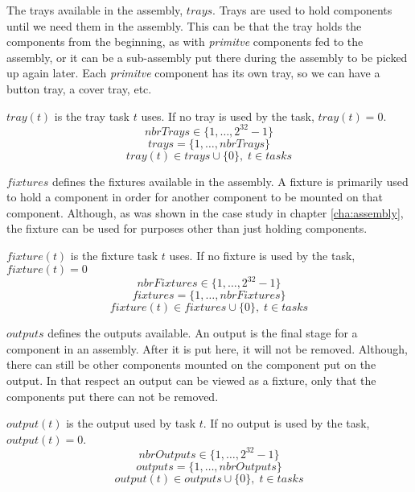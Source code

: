   \noindent The trays available in the assembly, $trays$. Trays are used to hold components until we need them in the assembly. This can be that the tray holds the components from the beginning, as with \emph{primitve} components fed to the assembly, or it can be a sub-assembly put there during the assembly to be picked up again later. Each \emph{primitve} component has its own tray, so we can have a button tray, a cover tray, etc.
  
  $tray(t)$ is the tray task $t$ uses. If no tray is used by the task, $tray(t) = 0$.
 \begin{equation}\label{eq:4}
 nbrTrays \in \{1 , \ldots , 2^{32}-1\}
 \end{equation}
 \begin{equation}\label{eq:14}
 trays = \{1 , \ldots , nbrTrays\}
 \end{equation}
 \begin{equation}\label{eq:22}
 tray(t) \in trays \cup \{0\}, \; t \in tasks
 \end{equation}

  \noindent $fixtures$ defines the fixtures available in the assembly. A fixture is primarily used to hold a component in order for another component to be mounted on that component. Although, as was shown in the case study in chapter \ref{cha:assembly}, the fixture can be used for purposes other than just holding components.
  
  $fixture(t)$ is the fixture task $t$ uses. If no fixture is used by the task, $fixture(t) = 0$
 \begin{equation}\label{eq:5}
 nbrFixtures \in \{1 , \ldots , 2^{32}-1\}
 \end{equation}
 \begin{equation}\label{eq:15}
 fixtures = \{1 , \ldots , nbrFixtures\}
 \end{equation}
 \begin{equation}\label{eq:24}
 fixture(t) \in fixtures \cup \{0\}, \; t \in tasks
 \end{equation}

  \noindent $outputs$ defines the outputs available. An output is the final stage for a component in an assembly. After it is put here, it will not be removed. Although, there can still be other components mounted on the component put on the output. In that respect an output can be viewed as a fixture, only that the components put there can not be removed.
 
 $output(t)$ is the output used by task $t$. If no output is used by the task, $output(t) = 0$.
 \begin{equation}\label{eq:7}
 nbrOutputs \in \{1 , \ldots , 2^{32}-1\}
 \end{equation}
 \begin{equation}\label{eq:16}
 outputs = \{1 , \ldots , nbrOutputs\}
 \end{equation}
 \begin{equation}\label{eq:23}
 output(t) \in outputs \cup \{0\}, \; t \in tasks
 \end{equation}

